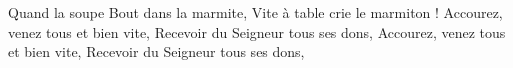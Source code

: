 \beginverse*
Quand la soupe
Bout dans la marmite,
Vite à table crie le marmiton !
Accourez, venez tous et bien vite,
Recevoir du Seigneur tous ses dons,
Accourez, venez tous et bien vite,
Recevoir du Seigneur tous ses dons,
\endverse
\endsong
